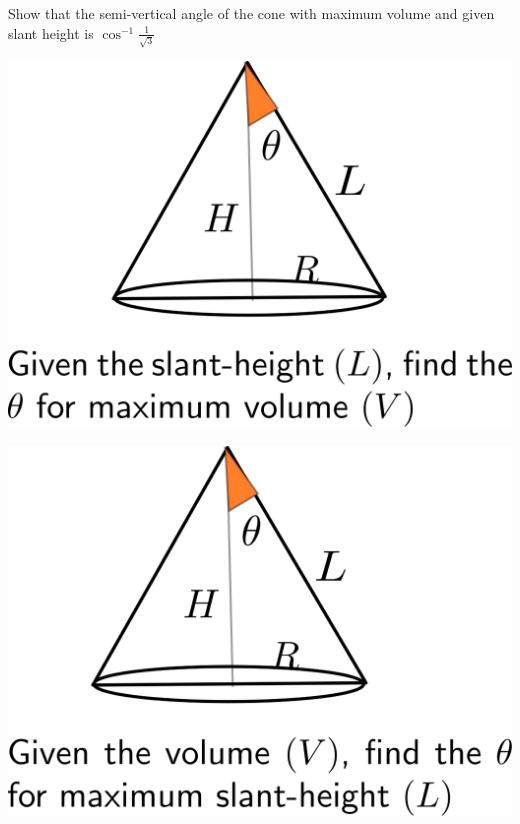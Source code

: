 \documentclass[14pt,fleqn]{extarticle}
\newcommand\ans{\cos^{-1} \frac{1}{\sqrt{3}}}
\begin{document}
\begin{problem}
	\statement 
    
    Show that the semi-vertical angle of the cone with maximum volume and given 
    slant height is $\ans$      
    
    \begin{step}
  \begin{options} 
    \correct

     \begin{center}
\includegraphics[scale=0.45]{img_right.svg}
\end{center}

    \incorrect
    
     \begin{center}
\includegraphics[scale=0.45]{img_wrong.svg}
\end{center}
        

\end{options}
\end{step}
\end{problem}
\end{document}

